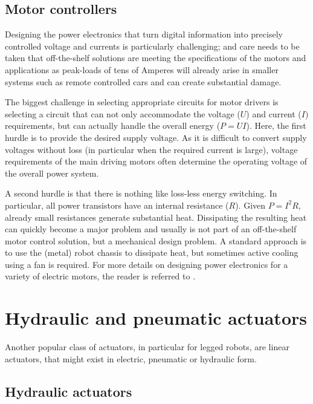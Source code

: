 \subsection{Motor controllers}

 Designing the power electronics that turn digital information into precisely controlled voltage and currents is particularly challenging;  and care needs to be taken that off-the-shelf solutions are meeting the specifications of the motors and applications as peak-loads of tens of Amperes will already arise in smaller systems such as remote controlled cars and can create substantial damage.

The biggest challenge in selecting appropriate circuits for motor drivers is selecting a circuit that can not only accommodate the voltage ($U$) and current ($I$) requirements, but can actually handle the overall energy ($P=UI$). Here, the first hurdle is to provide the desired supply voltage. As it is difficult to convert supply voltages without loss (in particular when the required current is large), voltage requirements of the main driving motors often determine the operating voltage of the overall power system.

A second hurdle is that there is nothing like loss-less energy switching. In particular, all power transistors have an internal resistance ($R$). Given $P=I^2R$, already small resistances generate substantial heat. Dissipating the resulting heat can quickly become a major problem and usually is not part of an off-the-shelf motor control solution, but a mechanical design problem. A standard approach is to use the (metal) robot chassis to dissipate heat, but sometimes active cooling using a fan is required. For more details on designing power electronics for a variety of electric motors, the reader is referred to \cite{hughes2019electric}.


\section{Hydraulic and pneumatic actuators}

Another popular class of actuators, in particular for legged robots, are linear actuators, that might exist in electric, pneumatic or hydraulic form.

\subsection{Hydraulic actuators}

